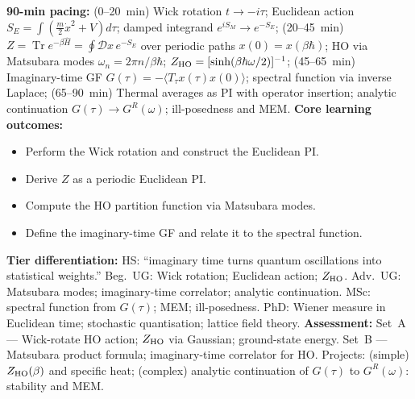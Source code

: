 \documentclass[11pt,a4paper]{article}
\begin{document}
\begin{tcolorbox}[modulebox, title={Module~II.2 / L05: Imaginary-Time Path Integrals}]
\textbf{90-min pacing:} (0--20~min) Wick rotation $t\to-i\tau$; Euclidean action $S_E=\int(\tfrac{m}{2}\dot{x}^2+V)d\tau$; damped integrand $e^{iS_M}\to e^{-S_E}$; (20--45~min) $Z=\operatorname{Tr}e^{-\beta\hat{H}}=\oint\mathcal{D}x\,e^{-S_E}$ over periodic paths $x(0)=x(\beta\hbar)$; HO via Matsubara modes $\omega_n=2\pi n/\beta\hbar$; $Z_{\rm HO}=[\sinh(\beta\hbar\omega/2)]^{-1}$; (45--65~min) Imaginary-time GF $G(\tau)=-\langle T_\tau x(\tau)x(0)\rangle$; spectral function via inverse Laplace; (65--90~min) Thermal averages as PI with operator insertion; analytic continuation $G(\tau)\to G^R(\omega)$; ill-posedness and MEM.
\medskip\textbf{Core learning outcomes:}
\begin{itemize}[leftmargin=1.4em,topsep=2pt,itemsep=1pt]
  \item Perform the Wick rotation and construct the Euclidean PI.
  \item Derive $Z$ as a periodic Euclidean PI.
  \item Compute the HO partition function via Matsubara modes.
  \item Define the imaginary-time GF and relate it to the spectral function.
\end{itemize}
\medskip\textbf{Tier differentiation:}
HS: ``imaginary time turns quantum oscillations into statistical weights.''
Beg.\ UG: Wick rotation; Euclidean action; $Z_{\rm HO}$.
Adv.\ UG: Matsubara modes; imaginary-time correlator; analytic continuation.
MSc: spectral function from $G(\tau)$; MEM; ill-posedness.
PhD: Wiener measure in Euclidean time; stochastic quantisation; lattice field theory.
\medskip\textbf{Assessment:}
Set~A --- Wick-rotate HO action; $Z_{\rm HO}$ via Gaussian; ground-state energy.
Set~B --- Matsubara product formula; imaginary-time correlator for HO.
Projects: (simple) $Z_{\rm HO}(\beta)$ and specific heat; (complex) analytic continuation of $G(\tau)$ to $G^R(\omega)$: stability and MEM.
\end{tcolorbox}

\medskip
\end{document}
